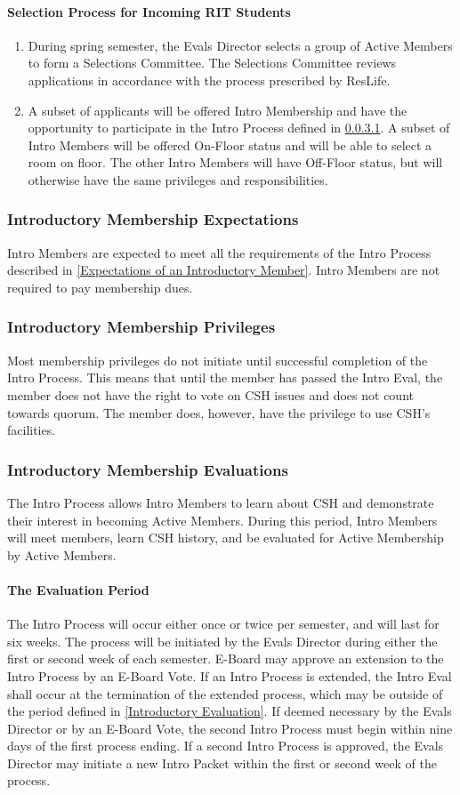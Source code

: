 \documentclass{article}
\newcommand{\asubsection}[1]{\subsubsection{#1} \label{#1}}
\newcommand{\asubsubsection}[1]{\paragraph{#1} \label{#1}}
\begin{document}
\asubsubsection{Selection Process for Incoming RIT Students}
\begin{enumerate}
	\item During spring semester, the Evals Director selects a group of Active Members to form a Selections Committee.
	      The Selections Committee reviews applications in accordance with the process prescribed by ResLife.
	\item A subset of applicants will be offered Intro Membership and have the opportunity to participate in the Intro Process defined in \ref{The Evaluation Period}.
	      A subset of Intro Members will be offered On-Floor status and will be able to select a room on floor.
	      The other Intro Members will have Off-Floor status, but will otherwise have the same privileges and responsibilities.
\end{enumerate}

\asubsection{Introductory Membership Expectations}
Intro Members are expected to meet all the requirements of the Intro Process described in \ref{Expectations of an Introductory Member}.
Intro Members are not required to pay membership dues.

\asubsection{Introductory Membership Privileges}
Most membership privileges do not initiate until successful completion of the Intro Process.
This means that until the member has passed the Intro Eval, the member does not have the right to vote on CSH issues and does not count towards quorum.
The member does, however, have the privilege to use CSH's facilities.

\asubsection{Introductory Membership Evaluations}
The Intro Process allows Intro Members to learn about CSH and demonstrate their interest in becoming Active Members. During this period, Intro Members will meet members, learn CSH history, and be evaluated for Active Membership by Active Members.

\asubsubsection{The Evaluation Period}
The Intro Process will occur either once or twice per semester, and will last for six weeks.
The process will be initiated by the Evals Director during either the first or second week of each semester. E-Board may approve an extension to the Intro Process by an E-Board Vote.
If an Intro Process is extended, the Intro Eval shall occur at the termination of the extended process, which may be outside of the period defined in \ref{Introductory Evaluation}.
If deemed necessary by the Evals Director or by an E-Board Vote, the second Intro Process must begin within nine days of the first process ending.
If a second Intro Process is approved, the Evals Director may initiate a new Intro Packet within the first or second week of the process.
\end{document}
